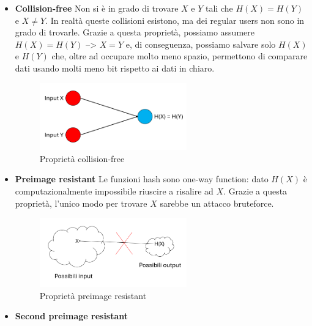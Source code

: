 \documentclass[12pt]{report}
\begin{document}
\begin{itemize}[topsep=5pt, itemsep=0pt]
    \item \textbf{Collision-free}\newline
    Non si è in grado di trovare \(X\) e \(Y\) tali che \(H(X) = H(Y)\) e \(X \neq Y\). In realtà queste collisioni esistono, ma dei regular users non sono in grado di trovarle.\newline
    Grazie a questa proprietà, possiamo assumere \(H(X) = H(Y)\) --> \(X = Y\) e, di conseguenza, possiamo salvare solo \(H(X)\) e \(H(Y)\) che, oltre ad occupare molto meno spazio, permettono di comparare dati usando molti meno bit rispetto ai dati in chiaro.
    \begin{figure}[H]
        \centering
        \includegraphics[width=0.6\textwidth]{Collision-free.PNG}
        \captionsetup{justification=centering}
        \caption{Proprietà collision-free \cite{Uno}}
        \label{fig:collisionfree}
    \end{figure}
    \item \textbf{Preimage resistant}\newline
    Le funzioni hash sono one-way function: dato \(H(X)\) è computazionalmente impossibile riuscire a risalire ad \(X\). Grazie a questa proprietà, l'unico modo per trovare \(X\) sarebbe un attacco bruteforce.
    \begin{figure}[H]
        \centering
        \includegraphics[width=0.6\textwidth]{Preimage resistant.PNG}
        \captionsetup{justification=centering}
        \caption{Proprietà preimage resistant \cite{Uno}}
        \label{fig:preimageresistant}
    \end{figure}
    \item \textbf{Second preimage resistant}\newline

\end{itemize}
\end{document}
